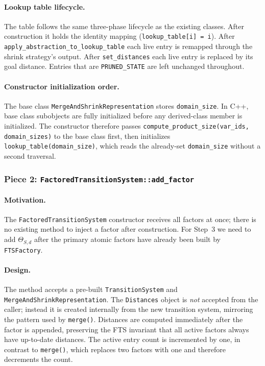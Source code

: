 \documentclass[11pt,a4paper]{article}
\begin{document}
\paragraph{Lookup table lifecycle.}
The table follows the same three-phase lifecycle as the existing classes.
After construction it holds the identity mapping (\texttt{lookup\_table[i] = i}).
After \texttt{apply\_abstraction\_to\_lookup\_table} each live entry is
remapped through the shrink strategy's output.  After \texttt{set\_distances}
each live entry is replaced by its goal distance.  Entries that are
\texttt{PRUNED\_STATE} are left unchanged throughout.

\paragraph{Constructor initialization order.}
The base class \texttt{MergeAndShrinkRepresentation} stores \texttt{domain\_size}.
In C++, base class subobjects are fully initialized before any derived-class
member is initialized.  The constructor therefore passes
\texttt{compute\_product\_size(var\_ids, domain\_sizes)} to the base class
first, then initializes \texttt{lookup\_table(domain\_size)}, which reads the
already-set \texttt{domain\_size} without a second traversal.

\subsubsection{Piece 2: \texttt{FactoredTransitionSystem::add\_factor}}
\label{sec:piece2}

\paragraph{Motivation.}
The \texttt{FactoredTransitionSystem} constructor receives all factors at once;
there is no existing method to inject a factor after construction.  For Step~3
we need to add $\Theta_{S,d}$ after the primary atomic factors have already
been built by \texttt{FTSFactory}.

\paragraph{Design.}
The method accepts a pre-built \texttt{TransitionSystem} and
\texttt{MergeAndShrinkRepresentation}.  The \texttt{Distances} object is
\emph{not} accepted from the caller; instead it is created internally from the
new transition system, mirroring the pattern used by \texttt{merge()}.
Distances are computed immediately after the factor is appended, preserving the
FTS invariant that all active factors always have up-to-date distances.  The
active entry count is incremented by one, in contrast to \texttt{merge()},
which replaces two factors with one and therefore decrements the count.
\end{document}
